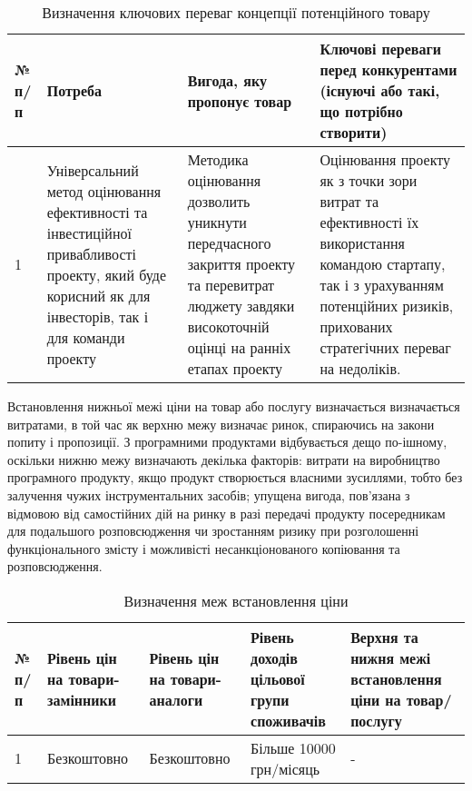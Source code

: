 \begin{table}[h!]
\fontsize{12pt}{12pt}\selectfont
	\begin{tabularx}{\textwidth}{|l|X|X|X|}
    \hline
    № п/п & Потреба & Вигода, яку пропонує товар & Ключові переваги перед конкурентами (існуючі або такі, що потрібно створити) \\ \hline
    1 & Універсальний метод оцінювання ефективності та інвестиційної привабливості проекту, який буде корисний як для інвесторів, так і для команди проекту & Методика оцінювання дозволить уникнути передчасного закриття проекту та перевитрат люджету завдяки високоточній оцінці на ранніх етапах проекту & Оцінювання проекту як з точки зори витрат та ефективності їх використання командою стартапу, так і з урахуванням потенційних ризиків, прихованих стратегічних переваг на недоліків. \\
    \hline
    \end{tabularx}
\caption{Визначення ключових переваг концепції потенційного товару} \label{tab:stab_14}
\end{table}

Встановлення нижньої межі ціни на товар або послугу визначається визначається витратами, в той час як верхню межу визначає ринок, спираючись на закони попиту і пропозиції. З програмними продуктами відбувається дещо по-ішному, оскільки нижню межу визначають декілька факторів: витрати на виробництво програмного продукту, якщо продукт створюється власними зусиллями, тобто без залучення чужих інструментальних засобів; упущена вигода, пов'язана з відмовою від самостійних дій на ринку в разі передачі продукту посередникам для подальшого розповсюдження чи зростанням ризику при розголошенні функціонального змісту і можливісті несанкціонованого копіювання та розповсюдження.

\begin{table}[h!]
\fontsize{12pt}{12pt}\selectfont
	\begin{tabularx}{\textwidth}{|l|X|X|X|X|}
    \hline
    № п/п & Рівень цін на товари-замінники & Рівень цін на товари-аналоги & Рівень доходів цільової групи споживачів & Верхня та нижня межі встановлення ціни на товар/послугу \\ \hline
    1 & Безкоштовно & Безкоштовно & Більше 10000 грн/місяць & - \\
    \hline
    \end{tabularx}
\caption{Визначення меж встановлення ціни} \label{tab:stab_15}
\end{table}

